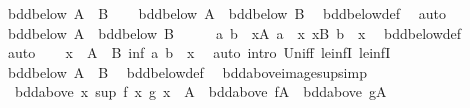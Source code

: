 \begin{isabellebody}
\ {\isachardoublequoteopen}bdd{\isacharunderscore}{\kern0pt}below\ {\isacharparenleft}{\kern0pt}A\ {\isasymunion}\ B{\isacharparenright}{\kern0pt}{\isachardoublequoteclose}\isanewline
\ \ \isamarkupfalse%
\ {\isachardoublequoteopen}bdd{\isacharunderscore}{\kern0pt}below\ A\ {\isasymand}\ bdd{\isacharunderscore}{\kern0pt}below\ B{\isachardoublequoteclose}\ \isamarkupfalse%
\ bdd{\isacharunderscore}{\kern0pt}below{\isacharunderscore}{\kern0pt}def\ \isamarkupfalse%
\ auto\isanewline
{}\isamarkupfalse%
\isanewline
\ \ \isamarkupfalse%
\ {\isachardoublequoteopen}bdd{\isacharunderscore}{\kern0pt}below\ A\ {\isasymand}\ bdd{\isacharunderscore}{\kern0pt}below\ B{\isachardoublequoteclose}\isanewline
\ \ \isamarkupfalse%
\ \isamarkupfalse%
\ a\ b\ \ {\isachardoublequoteopen}{\isasymforall}x{\isasymin}A{\isachardot}{\kern0pt}\ a\ {\isasymle}\ x{\isachardoublequoteclose}\ {\isachardoublequoteopen}{\isasymforall}x{\isasymin}B{\isachardot}{\kern0pt}\ b\ {\isasymle}\ x{\isachardoublequoteclose}\ \isamarkupfalse%
\ bdd{\isacharunderscore}{\kern0pt}below{\isacharunderscore}{\kern0pt}def\ \isamarkupfalse%
\ auto\isanewline
\ \ \isamarkupfalse%
\ {\isachardoublequoteopen}{\isasymforall}x\ {\isasymin}\ A\ {\isasymunion}\ B{\isachardot}{\kern0pt}\ inf\ a\ b\ {\isasymle}\ x{\isachardoublequoteclose}\ \isamarkupfalse%
\ {\isacharparenleft}{\kern0pt}auto\ intro{\isacharcolon}{\kern0pt}\ Un{\isacharunderscore}{\kern0pt}iff\ le{\isacharunderscore}{\kern0pt}infI{}\ le{\isacharunderscore}{\kern0pt}infI{}{\isacharparenright}{\kern0pt}\isanewline
\ \ \isamarkupfalse%
\ {\isachardoublequoteopen}bdd{\isacharunderscore}{\kern0pt}below\ {\isacharparenleft}{\kern0pt}A\ {\isasymunion}\ B{\isacharparenright}{\kern0pt}{\isachardoublequoteclose}\ \isamarkupfalse%
\ bdd{\isacharunderscore}{\kern0pt}below{\isacharunderscore}{\kern0pt}def\ \isacommand{{\isachardot}{\kern0pt}{\isachardot}{\kern0pt}}\isamarkupfalse%
\isanewline
{}\isamarkupfalse%
%
\endisatagproof
{\isafoldproof}%
%
\isadelimproof
\isanewline
%
\endisadelimproof
\isanewline
{}\isamarkupfalse%
\ bdd{\isacharunderscore}{\kern0pt}above{\isacharunderscore}{\kern0pt}image{\isacharunderscore}{\kern0pt}sup{\isacharbrackleft}{\kern0pt}simp{\isacharbrackright}{\kern0pt}{\isacharcolon}{\kern0pt}\isanewline
\ \ {\isachardoublequoteopen}bdd{\isacharunderscore}{\kern0pt}above\ {\isacharparenleft}{\kern0pt}{\isacharparenleft}{\kern0pt}{\isasymlambda}x{\isachardot}{\kern0pt}\ sup\ {\isacharparenleft}{\kern0pt}f\ x{\isacharparenright}{\kern0pt}\ {\isacharparenleft}{\kern0pt}g\ x{\isacharparenright}{\kern0pt}{\isacharparenright}{\kern0pt}\ {\isacharbackquote}{\kern0pt}\ A{\isacharparenright}{\kern0pt}\ {\isasymlongleftrightarrow}\ bdd{\isacharunderscore}{\kern0pt}above\ {\isacharparenleft}{\kern0pt}f{\isacharbackquote}{\kern0pt}A{\isacharparenright}{\kern0pt}\ {\isasymand}\ bdd{\isacharunderscore}{\kern0pt}above\ {\isacharparenleft}{\kern0pt}g{\isacharbackquote}{\kern0pt}A{\isacharparenright}{\kern0pt}{\isachardoublequoteclose}\isanewline

\end{isabellebody}
